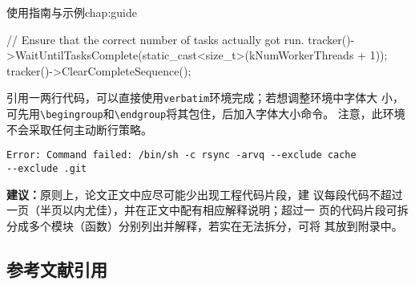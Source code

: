 \begin{cuzchapter}{使用指南与示例}{chap:guide}
\begin{listing}[H]
\begin{cppcode}
            // Ensure that the correct number of tasks actually got run.
            tracker()->WaitUntilTasksComplete(static_cast<size_t>(kNumWorkerThreads + 1));
            tracker()->ClearCompleteSequence();
        \end{cppcode}
    \end{listing}

    引用一两行代码，可以直接使用\texttt{verbatim}环境完成；若想调整环境中字体大
    小，可先用\verb|\begingroup|和\verb|\endgroup|将其包住，后加入字体大小命令。
    注意，此环境不会采取任何主动断行策略。

    \begingroup
    \small
    \begin{verbatim}
Error: Command failed: /bin/sh -c rsync -arvq --exclude cache
--exclude .git
    \end{verbatim}
    \endgroup

    \begin{leftbar}
        \noindent\textbf{建议：}原则上，论文正文中应尽可能少出现工程代码片段，建
        议每段代码不超过一页（半页以内尤佳），并在正文中配有相应解释说明；超过一
        页的代码片段可拆分成多个模块（函数）分别列出并解释，若实在无法拆分，可将
        其放到附录中。
    \end{leftbar}

    \subsection{参考文献引用}\label{sub:references}


\end{cuzchapter}
